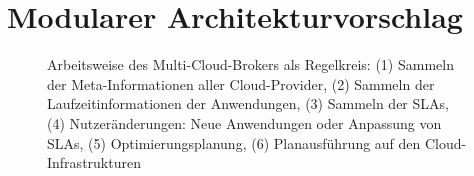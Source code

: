 \section{Modularer Architekturvorschlag}
\label{sec:architektur}

%
%
%


\begin{figure}
	\centering	
	\def\svgwidth{0.95\textwidth}
	{\tiny
	}
	\caption{Arbeitsweise des Multi-Cloud-Brokers als Regelkreis: (1) Sammeln der Meta-Informationen aller Cloud-Provider, (2) Sammeln der Laufzeitinformationen der Anwendungen, (3) Sammeln der SLAs, (4) Nutzeränderungen: Neue Anwendungen oder Anpassung von SLAs, (5) Optimierungsplanung, (6) Planausführung auf den Cloud-Infrastrukturen}
	\label{fig:cycle}
\end{figure}


